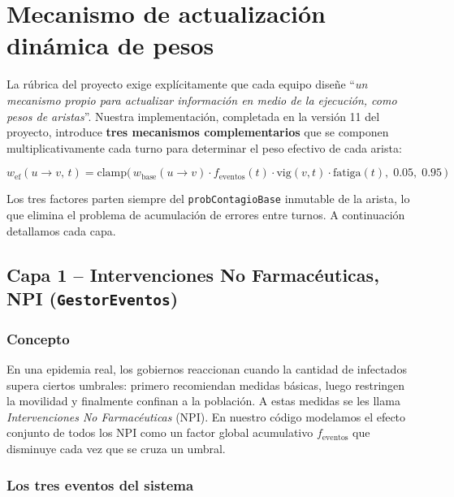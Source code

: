 \documentclass[spanish,notitlepage,letterpaper, 12pt]{article}
\begin{document}
\newpage
\section{Mecanismo de actualizaci\'on din\'amica de pesos}
\label{sec:eventos}

La r\'ubrica del proyecto exige expl\'icitamente que cada equipo dise\~ne ``\textit{un mecanismo propio para actualizar informaci\'on en medio de la ejecuci\'on, como pesos de aristas}''. Nuestra implementaci\'on, completada en la versi\'on 11 del proyecto, introduce \textbf{tres mecanismos complementarios} que se componen multiplicativamente cada turno para determinar el peso efectivo de cada arista:

\begin{equation}
\boxed{
w_{\text{ef}}(u{\to}v,\,t) = \mathrm{clamp}\!\Big(\, w_{\text{base}}(u{\to}v)\cdot f_{\text{eventos}}(t)\cdot \mathrm{vig}(v,t)\cdot \mathrm{fatiga}(t),\; 0.05,\; 0.95 \,\Big)
}
\label{eq:peso_efectivo}
\end{equation}

Los tres factores parten siempre del \texttt{probContagioBase} inmutable de la arista, lo que elimina el problema de acumulaci\'on de errores entre turnos. A continuaci\'on detallamos cada capa.

\subsection{Capa 1 -- Intervenciones No Farmac\'euticas, NPI (\texttt{GestorEventos})}

\subsubsection{Concepto}

En una epidemia real, los gobiernos reaccionan cuando la cantidad de infectados supera ciertos umbrales: primero recomiendan medidas b\'asicas, luego restringen la movilidad y finalmente confinan a la poblaci\'on. A estas medidas se les llama \textit{Intervenciones No Farmac\'euticas} (NPI). En nuestro c\'odigo modelamos el efecto conjunto de todos los NPI como un factor global acumulativo $f_{\text{eventos}}$ que disminuye cada vez que se cruza un umbral.

\subsubsection{Los tres eventos del sistema}
\end{document}
